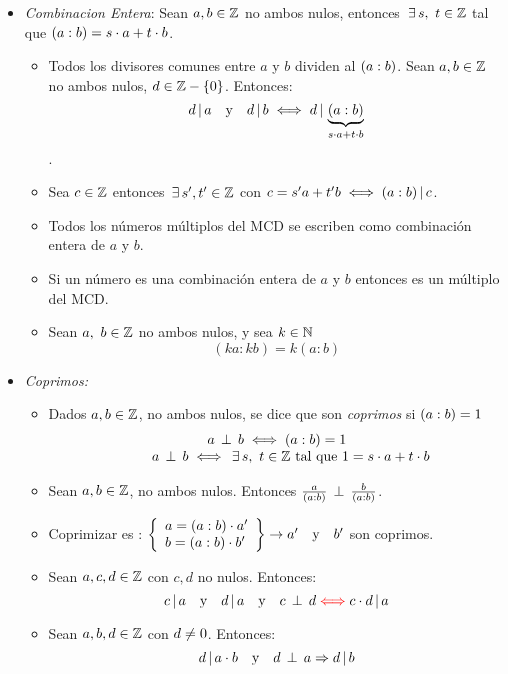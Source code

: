 \begin{itemize}
	\item \textit{Combinacion Entera}:
	      Sean $a,b \en \enteros$ no ambos nulos, entonces $\existe s,\ t \en \enteros$ tal que $\mcd = \cz$.
	      \begin{itemize}
		      \item Todos los divisores comunes entre $a$ y $b$ dividen al $\mcd$. Sean $a,b \en \enteros$ no ambos nulos, $d \en \enteros - \set{0}$. Entonces:
		            \[
			            d \divideA a \ytext d \divideA b \sisolosi d \divideA \ub{\mcd}{\cz}
		            \].
		      \item Sea $c \en \enteros$ entonces $\existe s', t' \en \enteros$ con $c = s'a + t'b \sisolosi \mcd \divideA c$.
		      \item Todos los números múltiplos del MCD se escriben como combinación entera de $a$ y $b$.
		      \item Si un número es una combinación entera de $a$ y $b$ entonces es un múltiplo del MCD.
		      \item Sean $a,\ b \en \enteros$ no ambos nulos, y sea $k \en \naturales$
		            \[
			            (ka:kb) = k(a:b)
		            \]
	      \end{itemize}
	\item \textit{Coprimos: }
	      \begin{itemize}
		      \item
		            Dados $a,b \en \enteros$, no ambos nulos, se dice que son \textit{coprimos} si $\mcd = 1$
		            \[
			            \begin{array}{c}
				            a \cop b \sisolosi \mcd = 1 \\
				            \qquad a\cop b \sisolosi \existe s,\ t \en \enteros \text{ tal que } 1 = \cz
			            \end{array}
		            \]
		      \item
		            Sean $a,b \en \enteros$, no ambos nulos. Entonces $\frac{a}{\mcd}\cop \frac{b}{\mcd}$.
		      \item Coprimizar es :
		            $\llaves{l}{
				            a = \mcd \cdot a'\\
				            b = \mcd \cdot b'
			            }\to a' \ytext b'$ son coprimos.

		      \item Sean $a, c, d \en \enteros$ con $c,d$ no nulos. Entonces:
		            \[
			            c \divideA a \ytext d \divideA a \ytext c \cop d \red{\sisolosi} c\cdot d \divideA a
		            \]
		      \item Sean $a, b, d \en \enteros$ con $d \distinto 0$. Entonces:
		            \[
			            d \divideA a \cdot b \ytext d \cop a   \entonces d \divideA b
		            \]


\end{itemize}
\end{itemize}

